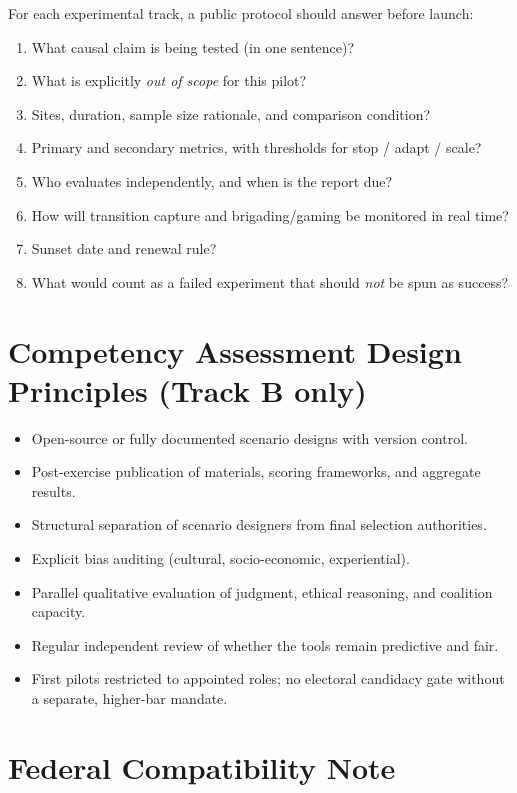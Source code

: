 \documentclass[11pt,a4paper]{article}
\begin{document}
For each experimental track, a public protocol should answer before launch:

\begin{enumerate}[leftmargin=*]
    \item What causal claim is being tested (in one sentence)?
    \item What is explicitly \emph{out of scope} for this pilot?
    \item Sites, duration, sample size rationale, and comparison condition?
    \item Primary and secondary metrics, with thresholds for stop / adapt / scale?
    \item Who evaluates independently, and when is the report due?
    \item How will transition capture and brigading/gaming be monitored in real time?
    \item Sunset date and renewal rule?
    \item What would count as a failed experiment that should \emph{not} be spun as success?
\end{enumerate}

\section{Competency Assessment Design Principles (Track B only)}

\begin{itemize}[leftmargin=*]
    \item Open-source or fully documented scenario designs with version control.
    \item Post-exercise publication of materials, scoring frameworks, and aggregate results.
    \item Structural separation of scenario designers from final selection authorities.
    \item Explicit bias auditing (cultural, socio-economic, experiential).
    \item Parallel qualitative evaluation of judgment, ethical reasoning, and coalition capacity.
    \item Regular independent review of whether the tools remain predictive and fair.
    \item First pilots restricted to appointed roles; no electoral candidacy gate without a separate, higher-bar mandate.
\end{itemize}

\section{Federal Compatibility Note}
\end{document}
